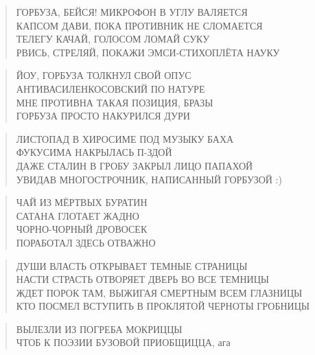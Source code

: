 \poemtitle{***}
\begin{verse}
ГОРБУЗА, БЕЙСЯ! МИКРОФОН В УГЛУ ВАЛЯЕТСЯ\\
КАПСОМ ДАВИ, ПОКА ПРОТИВНИК НЕ СЛОМАЕТСЯ\\
ТЕЛЕГУ КАЧАЙ, ГОЛОСОМ ЛОМАЙ СУКУ\\
РВИСЬ, СТРЕЛЯЙ, ПОКАЖИ ЭМСИ-СТИХОПЛЁТА НАУКУ
\end{verse}

\poemtitle{***}
\begin{verse}
ЙОУ, ГОРБУЗА ТОЛКНУЛ СВОЙ ОПУС\\
АНТИВАСИЛЕНКОСОВСКИЙ ПО НАТУРЕ\\
МНЕ ПРОТИВНА ТАКАЯ ПОЗИЦИЯ, БРАЗЫ\\
ГОРБУЗА ПРОСТО НАКУРИЛСЯ ДУРИ
\end{verse}

\poemtitle{***}
\begin{verse}
ЛИСТОПАД В ХИРОСИМЕ ПОД МУЗЫКУ БАХА\\
ФУКУСИМА НАКРЫЛАСЬ П-ЗДОЙ\\
ДАЖЕ СТАЛИН В ГРОБУ ЗАКРЫЛ ЛИЦО ПАПАХОЙ\\
УВИДАВ МНОГОСТРОЧНИК, НАПИСАННЫЙ ГОРБУЗОЙ :)
\end{verse}

\poemtitle{***}
\begin{verse}
ЧАЙ ИЗ МЁРТВЫХ БУРАТИН\\
САТАНА ГЛОТАЕТ ЖАДНО\\
ЧОРНО-ЧОРНЫЙ ДРОВОСЕК\\
ПОРАБОТАЛ ЗДЕСЬ ОТВАЖНО
\end{verse}

\poemtitle{***}
\begin{verse}
ДУШИ ВЛАСТЬ ОТКРЫВАЕТ ТЕМНЫЕ СТРАНИЦЫ\\
НАСТИ СТРАСТЬ ОТВОРЯЕТ ДВЕРЬ ВО ВСЕ ТЕМНИЦЫ\\
ЖДЕТ ПОРОК ТАМ, ВЫЖИГАЯ СМЕРТНЫМ ВСЕМ ГЛАЗНИЦЫ\\
КТО ПОСМЕЛ ВСТУПИТЬ В ПРОКЛЯТОЙ ЧЕРНОТЫ ГРОБНИЦЫ
\end{verse}

\poemtitle{***}
\begin{verse}
ВЫЛЕЗЛИ ИЗ ПОГРЕБА МОКРИЦЦЫ\\
ЧТОБ К ПОЭЗИИ БУЗОВОЙ ПРИОБЩИЦЦА, ага
\end{verse}

